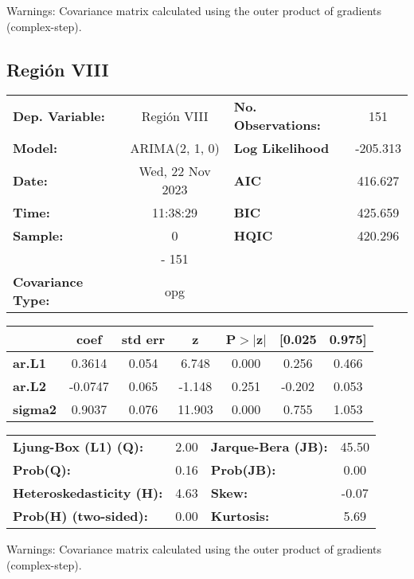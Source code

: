 \documentclass{article}%
\begin{document}
Warnings: \newline
 [1] Covariance matrix calculated using the outer product of gradients (complex-step).%
\subsection*{Región VIII}%
\begin{center}
\begin{tabular}{lclc}
\toprule
\textbf{Dep. Variable:}          &   Región VIII    & \textbf{  No. Observations:  } &    151      \\
\textbf{Model:}                  &  ARIMA(2, 1, 0)  & \textbf{  Log Likelihood     } &  -205.313   \\
\textbf{Date:}                   & Wed, 22 Nov 2023 & \textbf{  AIC                } &  416.627    \\
\textbf{Time:}                   &     11:38:29     & \textbf{  BIC                } &  425.659    \\
\textbf{Sample:}                 &        0         & \textbf{  HQIC               } &  420.296    \\
\textbf{}                        &       - 151      & \textbf{                     } &             \\
\textbf{Covariance Type:}        &       opg        & \textbf{                     } &             \\
\bottomrule
\end{tabular}
\begin{tabular}{lcccccc}
                & \textbf{coef} & \textbf{std err} & \textbf{z} & \textbf{P$> |$z$|$} & \textbf{[0.025} & \textbf{0.975]}  \\
\midrule
\textbf{ar.L1}  &       0.3614  &        0.054     &     6.748  &         0.000        &        0.256    &        0.466     \\
\textbf{ar.L2}  &      -0.0747  &        0.065     &    -1.148  &         0.251        &       -0.202    &        0.053     \\
\textbf{sigma2} &       0.9037  &        0.076     &    11.903  &         0.000        &        0.755    &        1.053     \\
\bottomrule
\end{tabular}
\begin{tabular}{lclc}
\textbf{Ljung-Box (L1) (Q):}     & 2.00 & \textbf{  Jarque-Bera (JB):  } & 45.50  \\
\textbf{Prob(Q):}                & 0.16 & \textbf{  Prob(JB):          } &  0.00  \\
\textbf{Heteroskedasticity (H):} & 4.63 & \textbf{  Skew:              } & -0.07  \\
\textbf{Prob(H) (two-sided):}    & 0.00 & \textbf{  Kurtosis:          } &  5.69  \\
\bottomrule
\end{tabular}
\end{center}

Warnings: \newline
 [1] Covariance matrix calculated using the outer product of gradients (complex-step).

%
\end{document}
